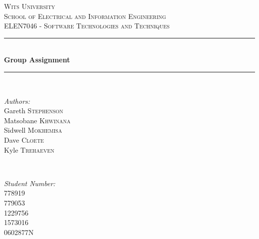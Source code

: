 \documentclass[12pt]{article} %
\begin{document}
	
	
	\begin{titlepage}
		
		\newcommand{\HRule}{\rule{\linewidth}{0.5mm}} %
		
		\center %
		
		\textsc{\LARGE Wits University}\\[1.5cm] %
		\textsc{\Large School of Electrical and Information Engineering}\\[0.5cm] %
		\textsc{\large ELEN7046 - Software Technologies and Techniques}\\[0.5cm] %
		
		\HRule \\[0.4cm]
		{ \huge \bfseries Group Assignment}\\[0.4cm] %
		
		\HRule \\[0.6cm]
		
		\begin{minipage}
			{0.4
				\textwidth} 
			\begin{flushleft}
				\large \emph{Authors:}\\
				Gareth \textsc{Stephenson} \\
				Matsobane \textsc{Khwinana} \\
				Sidwell \textsc{Mokhemisa} \\
				Dave \textsc{Cloete}\\
				Kyle \textsc{Trehaeven}
			\end{flushleft}
		\end{minipage}
		~ 
		\begin{minipage}
			{0.4
				\textwidth} 
			\begin{flushright}
				\large \emph{Student Number:} \\
				778919 \\
				779053  \\
				1229756 \\
				1573016 \\
				0602877N
			\end{flushright}
		\end{minipage}
		\\[1cm]
		

\end{titlepage}
\end{document}
